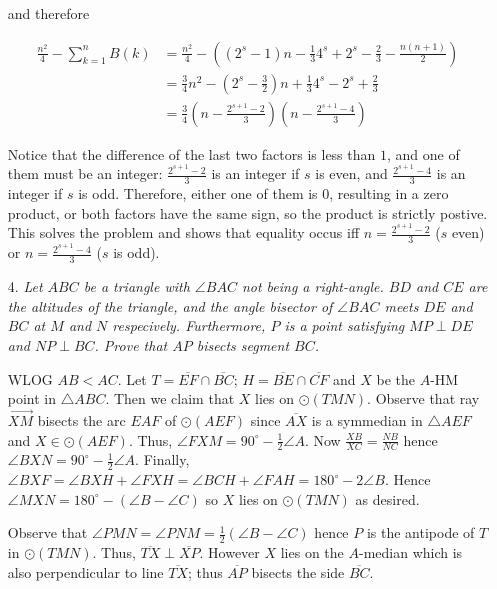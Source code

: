 \documentclass{article}
\begin{document}
\begin{enumerate}
and therefore

\begin{align*}
	\frac{n^2}{4} - \sum_{k = 1}^{n} B(k) &= \frac{n^2}{4} - ((2^s - 1)n - \frac{1}{3}4^s + 2^s - \frac{2}{3} - \frac{n(n + 1)}{2}) \\
	&= \frac{3}{4}n^2 - (2^s - \frac{3}{2})n + \frac{1}{3}4^s - 2^s + \frac{2}{3} \\
	&= \frac{3}{4}(n - \frac{2^{s + 1} - 2}{3})(n - \frac{2^{s + 1} - 4}{3})
\end{align*}

Notice that the difference of the last two factors is less than $1$, and one of them must be an integer: $\frac{2^{s + 1} - 2}{3}$ is an integer if $s$ is even, and $\frac{2^{s + 1} - 4}{3}$ is an integer if $s$ is odd. Therefore, either one of them is $0$, resulting in a zero product, or both factors have the same sign, so the product is strictly postive. This solves the problem and shows that equality occus iff $n = \frac{2^{s + 1} - 2}{3}$ ($s$ even) or $n = \frac{2^{s + 1} - 4}{3}$ ($s$ is odd).

\medskip
\item[4.] %
\textit{Let $ABC$ be a triangle with $\angle BAC$ not being a right-angle. $BD$ and $CE$ are the altitudes of the triangle, and the angle bisector of $\angle BAC$ meets $DE$ and $BC$ at $M$ and $N$ respecively. Furthermore, $P$ is a point satisfying $MP \perp DE$ and $NP \perp BC$. Prove that $AP$ bisects segment $BC$.}

WLOG $AB<AC$. Let $T=\overline{EF} \cap \overline{BC}$; $H=\overline{BE} \cap \overline{CF}$ and $X$ be the $A$-HM point in $\triangle ABC$. Then we claim that $X$ lies on $\odot(TMN)$. Observe that ray $\overrightarrow{XM}$ bisects the arc $EAF$ of $\odot(AEF)$ since $\overline{AX}$ is a symmedian in $\triangle AEF$ and $X \in \odot(AEF)$. Thus, $\angle FXM=90^{\circ}-\tfrac{1}{2}\angle A$. Now $\tfrac{XB}{XC}=\tfrac{NB}{NC}$ hence $\angle BXN=90^{\circ}-\tfrac{1}{2}\angle A$. Finally, $\angle BXF=\angle BXH+\angle FXH=\angle BCH+\angle FAH=180^{\circ}-2\angle B$. Hence $\angle MXN=180^{\circ}-(\angle B-\angle C)$ so $X$ lies on $\odot(TMN)$ as desired.

Observe that $\angle PMN=\angle PNM=\tfrac{1}{2}(\angle B-\angle C)$ hence $P$ is the antipode of $T$ in $\odot(TMN)$. Thus, $\overline{TX} \perp \overline{XP}$. However $X$ lies on the $A$-median which is also perpendicular to line $\overline{TX}$; thus $\overline{AP}$ bisects the side $\overline{BC}$.



\end{enumerate}
\end{document}
